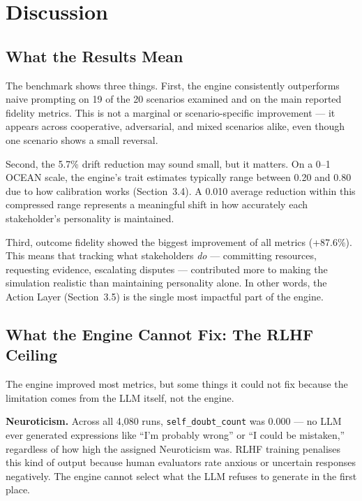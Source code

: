 \documentclass[12pt, a4paper]{report}
\begin{document}
\chapter{Discussion}

\section{What the Results Mean}

The benchmark shows three things. First, the engine consistently outperforms naive prompting on 19 of the 20 scenarios examined and on the main reported fidelity metrics. This is not a marginal or scenario-specific improvement --- it appears across cooperative, adversarial, and mixed scenarios alike, even though one scenario shows a small reversal.

Second, the 5.7\% drift reduction may sound small, but it matters. On a 0--1 OCEAN scale, the engine's trait estimates typically range between 0.20 and 0.80 due to how calibration works (Section~3.4). A 0.010 average reduction within this compressed range represents a meaningful shift in how accurately each stakeholder's personality is maintained.

Third, outcome fidelity showed the biggest improvement of all metrics (+87.6\%). This means that tracking what stakeholders \textit{do} --- committing resources, requesting evidence, escalating disputes --- contributed more to making the simulation realistic than maintaining personality alone. In other words, the Action Layer (Section~3.5) is the single most impactful part of the engine.


\section{What the Engine Cannot Fix: The RLHF Ceiling}

The engine improved most metrics, but some things it could not fix because the limitation comes from the LLM itself, not the engine.

\textbf{Neuroticism.} Across all 4,080 runs, \texttt{self\_doubt\_count} was 0.000 --- no LLM ever generated expressions like ``I'm probably wrong'' or ``I could be mistaken,'' regardless of how high the assigned Neuroticism was. RLHF training penalises this kind of output because human evaluators rate anxious or uncertain responses negatively. The engine cannot select what the LLM refuses to generate in the first place.
\end{document}
